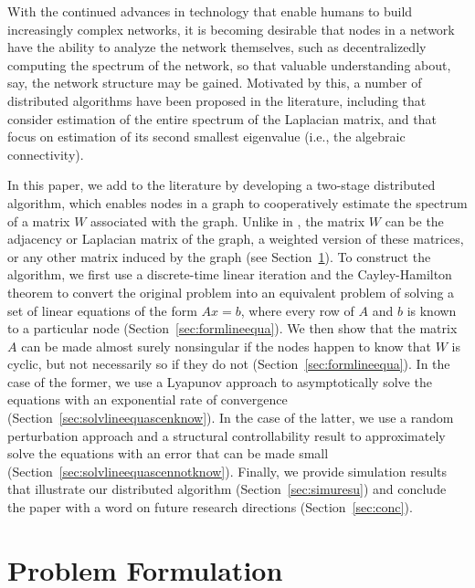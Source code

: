 \documentclass[11pt]{article}
\theoremstyle{plain}
\theoremstyle{definition}
\theoremstyle{remark}
\begin{document}
With the continued advances in technology that enable humans to build increasingly complex networks, it is becoming desirable that nodes in a network have the ability to analyze the network themselves, such as decentralizedly computing the spectrum of the network, so that valuable understanding about, say, the network structure may be gained. Motivated by this, a number of distributed algorithms have been proposed in the literature, including \cite{Sahai12, Franceschelli13, TranTMD14} that consider estimation of the entire spectrum of the Laplacian matrix, and \cite{YangP10, Aragues12, LiC13} that focus on estimation of its second smallest eigenvalue (i.e., the algebraic connectivity).

In this paper, we add to the literature by developing a two-stage distributed algorithm, which enables nodes in a graph to cooperatively estimate the spectrum of a matrix $W$ associated with the graph. Unlike in \cite{Sahai12, Franceschelli13, TranTMD14, YangP10, Aragues12, LiC13}, the matrix $W$ can be the adjacency or Laplacian matrix of the graph, a weighted version of these matrices, or any other matrix induced by the graph (see Section~\ref{sec:probform}). To construct the algorithm, we first use a discrete-time linear iteration and the Cayley-Hamilton theorem to convert the original problem into an equivalent problem of solving a set of linear equations of the form $Ax=b$, where every row of $A$ and $b$ is known to a particular node (Section~\ref{sec:formlineequa}). We then show that the matrix $A$ can be made almost surely nonsingular if the nodes happen to know that $W$ is cyclic, but not necessarily so if they do not (Section~\ref{sec:formlineequa}). In the case of the former, we use a Lyapunov approach to asymptotically solve the equations with an exponential rate of convergence (Section~\ref{sec:solvlineequascenknow}). In the case of the latter, we use a random perturbation approach and a structural controllability result to approximately solve the equations with an error that can be made small (Section~\ref{sec:solvlineequascennotknow}). Finally, we provide simulation results that illustrate our distributed algorithm (Section~\ref{sec:simuresu}) and conclude the paper with a word on future research directions (Section~\ref{sec:conc}).

\section{Problem Formulation}\label{sec:probform}
\end{document}
